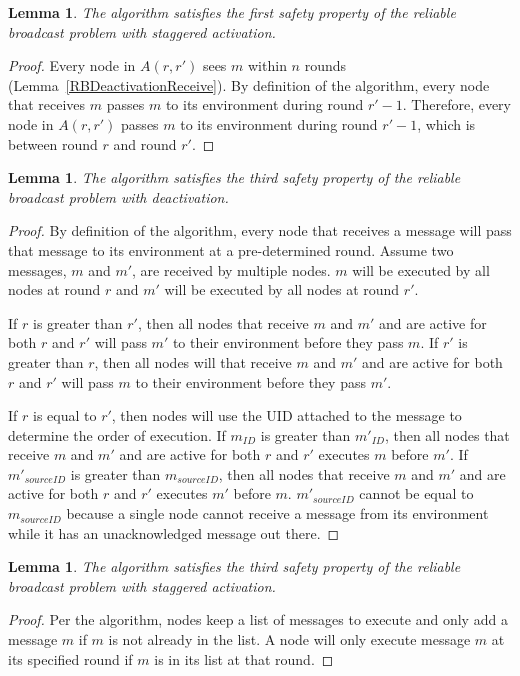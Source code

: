 \documentclass[english]{article}
\newtheorem{lemma}[theorem]{Lemma}
\begin{document}
\begin{lemma}
\label{DeactivationRBSafety1}
The algorithm satisfies the first safety property of the reliable broadcast problem with staggered activation.
\end{lemma}
\begin{proof}


Every node in $A(r,r')$ sees $m$ within $n$ rounds (Lemma~\ref{RBDeactivationReceive}). By definition of the algorithm, every node that receives $m$ passes $m$ to its environment during round $r'-1$. Therefore, every node in $A(r,r')$ passes $m$ to its environment during round $r'-1$, which is between round $r$ and round $r'$.

\end{proof}


\begin{lemma}
\label{DeactivationRBSafety2}
The algorithm satisfies the third safety property of the reliable broadcast problem with deactivation.
\end{lemma}
\begin{proof}

By definition of the algorithm, every node that receives a message will pass that message to its environment at a pre-determined round. Assume two messages, $m$ and $m'$, are received by multiple nodes. $m$ will be executed by all nodes at round $r$ and $m'$ will be executed by all nodes at round $r'$.

If $r$ is greater than $r'$, then all nodes that receive $m$ and $m'$ and are active for both $r$ and $r'$ will pass $m'$ to their environment before they pass $m$. If $r'$ is greater than $r$, then all nodes will that receive $m$ and $m'$ and are active for both $r$ and $r'$ will pass $m$ to their environment before they pass $m'$.

If $r$ is equal to $r'$, then nodes will use the UID attached to the message to determine the order of execution. If $m_{ID}$ is greater than $m'_{ID}$, then all nodes that receive $m$ and $m'$ and are active for both $r$ and $r'$ executes $m$ before $m'$. If $m'_{sourceID}$ is greater than $m_{sourceID}$, then all nodes that receive $m$ and $m'$ and are active for both $r$ and $r'$ executes $m'$ before $m$. $m'_{sourceID}$ cannot be equal to $m_{sourceID}$ because a single node cannot receive a message from its environment while it has an unacknowledged message out there.



\end{proof}


\begin{lemma}
\label{DeactivationRBSafety3}
The algorithm satisfies the third safety property of the reliable broadcast problem with staggered activation.
\end{lemma}
\begin{proof}

Per the algorithm, nodes keep a list of messages to execute and only add a message $m$ if $m$ is not already in the list. A node will only execute message $m$ at its specified round if $m$ is in its list at that round.

\end{proof}
\end{document}
